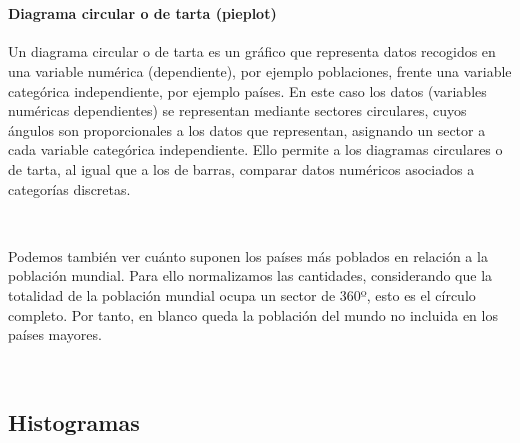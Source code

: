 \documentclass[11pt]{article}
\begin{document}
    \begin{center}
    \end{center}
    { \hspace*{\fill} \\}
    
    \paragraph{Diagrama circular o de tarta
(pieplot)}\label{diagrama-circular-o-de-tarta-pieplot}

Un diagrama circular o de tarta es un gráfico que representa datos
recogidos en una variable numérica (dependiente), por ejemplo
poblaciones, frente una variable categórica independiente, por ejemplo
países. En este caso los datos (variables numéricas dependientes) se
representan mediante sectores circulares, cuyos ángulos son
proporcionales a los datos que representan, asignando un sector a cada
variable categórica independiente. Ello permite a los diagramas
circulares o de tarta, al igual que a los de barras, comparar datos
numéricos asociados a categorías discretas.

    \begin{center}
    \end{center}
    { \hspace*{\fill} \\}
    
    Podemos también ver cuánto suponen los países más poblados en relación a
la población mundial. Para ello normalizamos las cantidades,
considerando que la totalidad de la población mundial ocupa un sector de
360º, esto es el círculo completo. Por tanto, en blanco queda la
población del mundo no incluida en los países mayores.

    \begin{center}
    \end{center}
    { \hspace*{\fill} \\}
    
    \subsection*{Histogramas}\label{histogramas}
\end{document}
